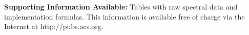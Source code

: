 \documentclass[journal=jctcce,manuscript=article]{achemso}
\begin{document}
\textbf{Supporting Information Available:}
Tables with raw spectral data and implementation formulas.
This information is available free of charge via the Internet at http://pubs.acs.org.

%
  




\end{document}
